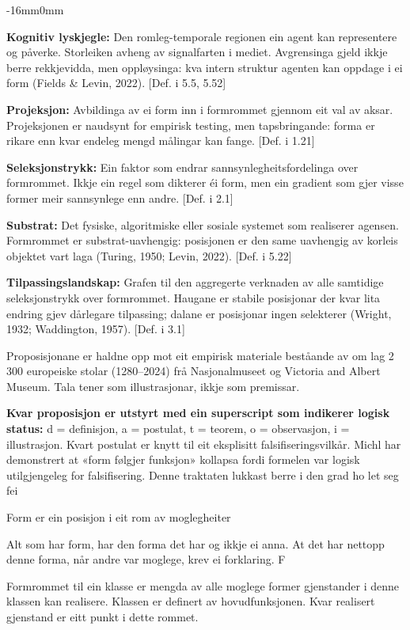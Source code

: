 \documentclass[10pt,oneside]{book}
\newlength{\propnumwidth}
\newlength{\propnumgap}
\newcommand{\prop}[3]{%
  \par\addvspace{6pt}%
  \noindent\llap{\makebox[\propnumwidth][l]{\textbf{#1}\textsuperscript{\textit{#2}}}\hspace{\propnumgap}}%
  #3\par%
  \addvspace{2pt}%
}
\newenvironment{ordliste}{%
  \begingroup\small\setlength{\parskip}{2pt plus 0.6pt}%
  \linespread{0.97}\selectfont
}{%
  \endgroup
}
\newcommand{\ordlisteentry}[2]{%
  \par\addvspace{2.5pt}%
  \noindent\textbf{#1:} #2\par%
}
\newenvironment{widebody}{%
  \begin{adjustwidth}{-16mm}{0mm}%
}{%
  \end{adjustwidth}%
}
\begin{document}
\begin{widebody}
\begin{ordliste}
\ordlisteentry{Kognitiv lyskjegle}{Den romleg-temporale regionen ein agent kan representere og påverke. Storleiken avheng av signalfarten i mediet. Avgrensinga gjeld ikkje berre rekkjevidda, men oppløysinga: kva intern struktur agenten kan oppdage i ei form (Fields \& Levin, 2022). [Def. i 5.5, 5.52]}
\ordlisteentry{Projeksjon}{Avbildinga av ei form inn i formrommet gjennom eit val av aksar. Projeksjonen er naudsynt for empirisk testing, men tapsbringande: forma er rikare enn kvar endeleg mengd målingar kan fange. [Def. i 1.21]}
\ordlisteentry{Seleksjonstrykk}{Ein faktor som endrar sannsynlegheitsfordelinga over formrommet. Ikkje ein regel som dikterer éi form, men ein gradient som gjer visse former meir sannsynlege enn andre. [Def. i 2.1]}
\ordlisteentry{Substrat}{Det fysiske, algoritmiske eller sosiale systemet som realiserer agensen. Formrommet er substrat-uavhengig: posisjonen er den same uavhengig av korleis objektet vart laga (Turing, 1950; Levin, 2022). [Def. i 5.22]}
\ordlisteentry{Tilpassingslandskap}{Grafen til den aggregerte verknaden av alle samtidige seleksjonstrykk over formrommet. Haugane er stabile posisjonar der kvar lita endring gjev dårlegare tilpassing; dalane er posisjonar ingen selekterer (Wright, 1932; Waddington, 1957). [Def. i 3.1]}
Proposisjonane er haldne opp mot eit empirisk materiale beståande av om lag 2 300 europeiske stolar (1280–2024) frå Nasjonalmuseet og Victoria and Albert Museum. Tala tener som illustrasjonar, ikkje som premissar.

\ordlisteentry{Kvar proposisjon er utstyrt med ein superscript som indikerer logisk status}{d = definisjon, a = postulat, t = teorem, o = observasjon, i = illustrasjon. Kvart postulat er knytt til eit eksplisitt falsifiseringsvilkår. Michl har demonstrert at «form følgjer funksjon» kollapsa fordi formelen var logisk utilgjengeleg for falsifisering. Denne traktaten lukkast berre i den grad ho let seg fei}
\end{ordliste}
\end{widebody}
\mainmatter
\clearpage
{}
\prop{1}{}{Form er ein posisjon i eit rom av moglegheiter}
\prop{1.1}{o}{Alt som har form, har den forma det har og ikkje ei anna. At det har nettopp denne forma, når andre var moglege, krev ei forklaring. F}
\prop{1.2}{d}{Formrommet til ein klasse er mengda av alle moglege former gjenstander i denne klassen kan realisere. Klassen er definert av hovudfunksjonen. Kvar realisert gjenstand er eitt punkt i dette rommet.}
\end{document}
